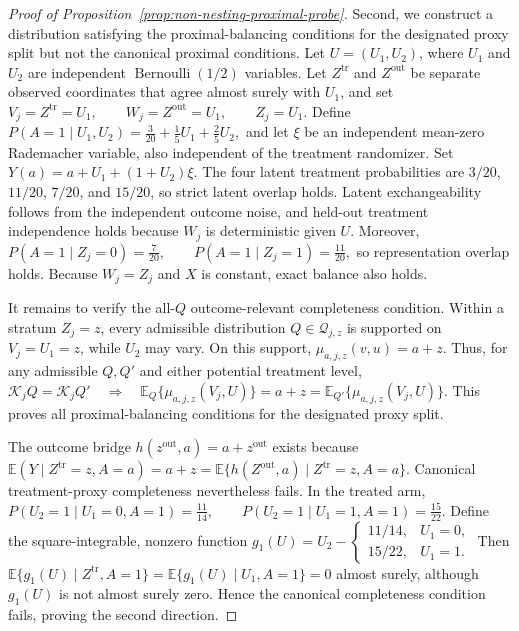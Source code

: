\begin{proof}[Proof of Proposition~\ref{prop:non-nesting-proximal-probe}]
Second, we construct a distribution satisfying the proximal-balancing conditions for the designated proxy split but not the canonical proximal conditions. Let $U=(U_1,U_2)$, where $U_1$ and $U_2$ are independent $\operatorname{Bernoulli}(1/2)$ variables. Let $Z^{\mathrm{tr}}$ and $Z^{\mathrm{out}}$ be separate observed coordinates that agree almost surely with $U_1$, and set
\(V_j=Z^{\mathrm{tr}}=U_1, \qquad W_j=Z^{\mathrm{out}}=U_1, \qquad Z_j=U_1.\)
Define
\(P(A=1\mid U_1,U_2) = \frac3{20}+\frac15U_1+\frac25U_2,\)
and let $\xi$ be an independent mean-zero Rademacher variable, also independent of the treatment randomizer. Set
\(Y(a)=a+U_1+(1+U_2)\xi.\)
The four latent treatment probabilities are $3/20$, $11/20$, $7/20$, and $15/20$, so strict latent overlap holds. Latent exchangeability follows from the independent outcome noise, and held-out treatment independence holds because $W_j$ is deterministic given $U$. Moreover,
\(P(A=1\mid Z_j=0)=\frac7{20}, \qquad P(A=1\mid Z_j=1)=\frac{11}{20},\)
so representation overlap holds. Because $W_j=Z_j$ and $X$ is constant, exact balance also holds.

It remains to verify the all-$Q$ outcome-relevant completeness condition. Within a stratum $Z_j=z$, every admissible distribution $Q\in\mathcal Q_{j,z}$ is supported on $V_j=U_1=z$, while $U_2$ may vary. On this support,
\(\mu_{a,j,z}(v,u)=a+z.\)
Thus, for any admissible $Q,Q'$ and either potential treatment level,
\(\mathcal K_jQ=\mathcal K_jQ' \quad\Longrightarrow\quad \mathbb E_Q\{\mu_{a,j,z}(V_j,U)\} =a+z =\mathbb E_{Q'}\{\mu_{a,j,z}(V_j,U)\}.\)
This proves all proximal-balancing conditions for the designated proxy split.

The outcome bridge $h(z^{\mathrm{out}},a)=a+z^{\mathrm{out}}$ exists because
\(\mathbb E(Y\mid Z^{\mathrm{tr}}=z,A=a) =a+z =\mathbb E\{h(Z^{\mathrm{out}},a)\mid Z^{\mathrm{tr}}=z,A=a\}.\)
Canonical treatment-proxy completeness nevertheless fails. In the treated arm,
\(P(U_2=1\mid U_1=0,A=1)=\frac{11}{14}, \qquad P(U_2=1\mid U_1=1,A=1)=\frac{15}{22}.\)
Define the square-integrable, nonzero function
\(g_1(U) = U_2- \begin{cases} 11/14,&U_1=0,\\ 15/22,&U_1=1. \end{cases}\)
Then
\(\mathbb E\{g_1(U)\mid Z^{\mathrm{tr}},A=1\} = \mathbb E\{g_1(U)\mid U_1,A=1\} =0\)
almost surely, although $g_1(U)$ is not almost surely zero. Hence the canonical completeness condition fails, proving the second direction.


\end{proof}
